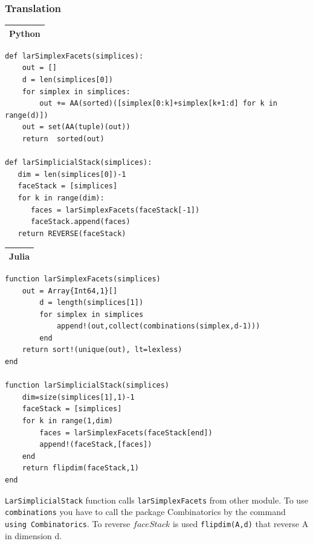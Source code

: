 \documentclass{article}
\begin{document}
\subsubsection{Translation}
\vspace{1ex}
\begin{flushleft} \small
\begin{center}
\begin{tabular}{|p{16cm}|}
\hline
\cellcolor[gray]{.9}Python\\
\hline
\end{tabular}
\end{center}
\vspace{2ex}
\begin{list}{}{} \item
\begin{Verbatim}[tabsize=4]
def larSimplexFacets(simplices):
    out = []
    d = len(simplices[0])
    for simplex in simplices:
        out += AA(sorted)([simplex[0:k]+simplex[k+1:d] for k in range(d)])
    out = set(AA(tuple)(out))
    return  sorted(out)
    
def larSimplicialStack(simplices):
   dim = len(simplices[0])-1
   faceStack = [simplices]
   for k in range(dim):
      faces = larSimplexFacets(faceStack[-1])
      faceStack.append(faces)
   return REVERSE(faceStack)    
\end{Verbatim}
\end{list}
\vspace{2ex}
\newpage
\begin{center}
\begin{tabular}{|p{16cm}|}
\hline
\cellcolor[gray]{.9}Julia\\
\hline
\end{tabular}
\end{center}
\vspace{2ex}
\begin{list}{}{} \item
   \begin{Verbatim}[tabsize=3]
function larSimplexFacets(simplices)
	out = Array{Int64,1}[]
		d = length(simplices[1])
		for simplex in simplices
			append!(out,collect(combinations(simplex,d-1)))
		end
	return sort!(unique(out), lt=lexless)
end

function larSimplicialStack(simplices)
    dim=size(simplices[1],1)-1   
    faceStack = [simplices]
    for k in range(1,dim)
        faces = larSimplexFacets(faceStack[end])
        append!(faceStack,[faces])
    end
    return flipdim(faceStack,1)
end       
   \end{Verbatim}
\end{list}
\end{flushleft}
\vspace{2ex}
\texttt{LarSimplicialStack} function calls \texttt{larSimplexFacets} from other module. To use \texttt{combinations} you have to call the package Combinatorics by the command \texttt{using Combinatorics}. To reverse $faceStack$ is used \texttt{flipdim(A,d)} that reverse A in dimension d.
\vspace{2ex}
\end{document}
